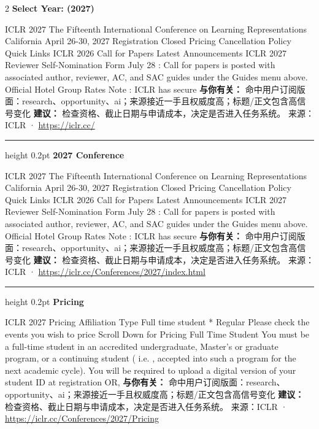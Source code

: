 \documentclass[10.5pt]{ctexart}
\begin{document}
\begin{multicols}{2}
{\large\bfseries Select Year: (2027)}\par
ICLR 2027 The Fifteenth International Conference on Learning Representations California April 26-30, 2027 Registration Closed Pricing Cancellation Policy Quick Links ICLR 2026 Call for Papers Latest Announcements ICLR 2027 Reviewer Self-Nomination Form July 28 : Call for papers is posted with associated author, reviewer, AC, and SAC guides under the Guides menu above. Official Hotel Group Rates Note : ICLR has secure
\textbf{与你有关：} 命中用户订阅版面：research、opportunity、ai；来源接近一手且权威度高；标题/正文包含高信号变化
\textbf{建议：} 检查资格、截止日期与申请成本，决定是否进入任务系统。
{\footnotesize\color{ormuted} 来源：ICLR · \url{https://iclr.cc/}}
\vspace{2mm}
\hrule height 0.2pt
\vspace{2mm}
{\large\bfseries 2027 Conference}\par
ICLR 2027 The Fifteenth International Conference on Learning Representations California April 26-30, 2027 Registration Closed Pricing Cancellation Policy Quick Links ICLR 2026 Call for Papers Latest Announcements ICLR 2027 Reviewer Self-Nomination Form July 28 : Call for papers is posted with associated author, reviewer, AC, and SAC guides under the Guides menu above. Official Hotel Group Rates Note : ICLR has secure
\textbf{与你有关：} 命中用户订阅版面：research、opportunity、ai；来源接近一手且权威度高；标题/正文包含高信号变化
\textbf{建议：} 检查资格、截止日期与申请成本，决定是否进入任务系统。
{\footnotesize\color{ormuted} 来源：ICLR · \url{https://iclr.cc/Conferences/2027/index.html}}
\vspace{2mm}
\hrule height 0.2pt
\vspace{2mm}
{\large\bfseries Pricing}\par
ICLR 2027 Pricing Affiliation Type Full time student * Regular Please check the events you wish to price Scroll Down for Pricing Full Time Student You must be a full-time student in an accredited undergraduate, Master’s or graduate program, or a continuing student ( i.e. , accepted into such a program for the next academic cycle). You will be required to upload a digital version of your student ID at registration OR,
\textbf{与你有关：} 命中用户订阅版面：research、opportunity、ai；来源接近一手且权威度高；标题/正文包含高信号变化
\textbf{建议：} 检查资格、截止日期与申请成本，决定是否进入任务系统。
{\footnotesize\color{ormuted} 来源：ICLR · \url{https://iclr.cc/Conferences/2027/Pricing}}

\end{multicols}
\end{document}
